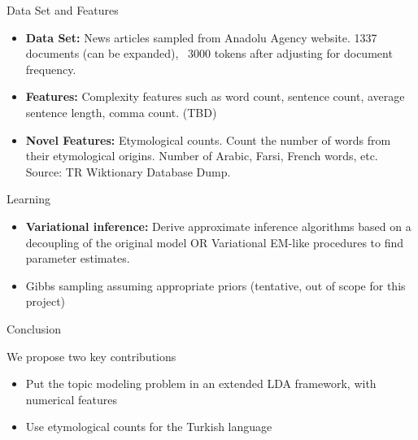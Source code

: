 \documentclass[pdf]{beamer}
\begin{document}
\begin{frame}{Data Set and Features}
	
	\begin{itemize}
		\item {\bf Data Set:} News articles sampled from Anadolu Agency website. 1337 documents (can be expanded), ~3000 tokens after adjusting for document frequency. 
		\item {\bf Features:} Complexity features such as word count, sentence count, average sentence length, comma count. (TBD)
		\item {\bf Novel Features:} Etymological counts. Count the number of words from their etymological origins. Number of Arabic, Farsi, French words, etc. Source: TR Wiktionary Database Dump.
	\end{itemize}
	
\end{frame}

\begin{frame}{Learning}
	
	\begin{itemize}
		\item {\bf Variational inference: } Derive approximate inference algorithms based on a decoupling of the original model OR Variational EM-like procedures to find parameter estimates.
		\item Gibbs sampling assuming appropriate priors (tentative, out of scope for this project)
	\end{itemize}
	
\end{frame}

\begin{frame}{Conclusion}
	
	We propose two key contributions
	\begin{itemize}
		\item Put the topic modeling problem in an extended LDA framework, with numerical features
		\item Use etymological counts for the Turkish language
	\end{itemize}
	
\end{frame}

{}

\end{document}
